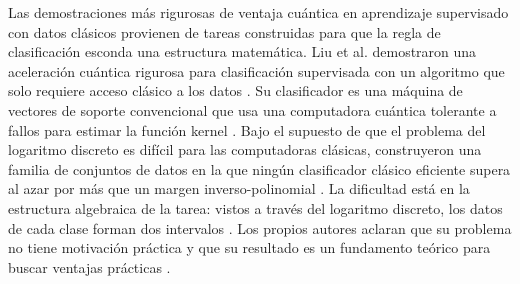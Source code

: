 Las demostraciones más rigurosas de ventaja cuántica en aprendizaje supervisado con datos clásicos provienen de tareas construidas para que la regla de clasificación esconda una estructura matemática.
Liu et al. demostraron una aceleración cuántica rigurosa para clasificación supervisada con un algoritmo que solo requiere acceso clásico a los datos \cite{Liu2021Speedup}.
Su clasificador es una máquina de vectores de soporte convencional que usa una computadora cuántica tolerante a fallos para estimar la función kernel \cite{Liu2021Speedup}.
Bajo el supuesto de que el problema del logaritmo discreto es difícil para las computadoras clásicas, construyeron una familia de conjuntos de datos en la que ningún clasificador clásico eficiente supera al azar por más que un margen inverso-polinomial \cite{Liu2021Speedup}.
La dificultad está en la estructura algebraica de la tarea: vistos a través del logaritmo discreto, los datos de cada clase forman dos intervalos \cite{Liu2021Speedup}.
Los propios autores aclaran que su problema no tiene motivación práctica y que su resultado es un fundamento teórico para buscar ventajas prácticas \cite{Liu2021Speedup}.

